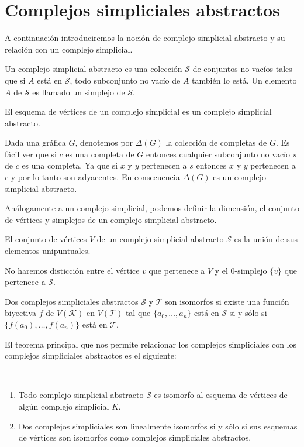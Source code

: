 \section{Complejos simpliciales abstractos}
A continuación introduciremos la noción de complejo simplicial abstracto y su relación con un complejo simplicial.
\begin{Defi}
Un complejo simplicial abstracto es una colección $\mathcal{S}$ de conjuntos no vacíos tales que si $A$ está en $\mathcal{S}$, todo subconjunto no vacío de $A$ también lo está. Un elemento $\textit{A}$ de $\mathcal{S}$ es llamado un simplejo de $\mathcal{S}$. 
\end{Defi}
\begin{Ejem}
El esquema de vértices de un complejo simplicial es un complejo simplicial abstracto.
\end{Ejem}
\begin{Ejem}
Dada una gráfica $G$, denotemos por $\Delta(G)$ la colección de completas de $G$. Es fácil ver que si $c$ es una completa de $G$ entonces cualquier subconjunto no vacío $s$ de $c$ es una completa. Ya que si $x$ y $y$ pertenecen a $s$ entonces $x$ y $y$ pertenecen a $c$ y por lo tanto son adyacentes. En consecuencia $\Delta(G)$ es un complejo simplicial abstracto.
\end{Ejem}
Análogamente a un complejo simplicial, podemos definir la dimensión, el conjunto de vértices y simplejos de un complejo simplicial abstracto.
\begin{Defi}
El conjunto de vértices $V$ de un complejo simplicial abstracto $\mathcal{S}$ es la unión de sus elementos unipuntuales.
\end{Defi}
No haremos disticción entre el vértice $v$ que pertenece a $V$ y el 0-simplejo $\{v\}$ que pertenece a $\mathcal{S}$.
\begin{Defi}
Dos complejos simpliciales abstractos $\mathcal{S}$ y $\mathcal{T}$ son isomorfos si existe una función biyectiva $f$ de $V(\mathcal{K})$ en $V(\mathcal{T})$ tal que $\{a_0,\ldots,a_n\}$ está en $\mathcal{S}$ si y sólo si $\{f(a_0),\ldots,f(a_n)\}$ está en $\mathcal{T}$.
\end{Defi}
El teorema principal que nos permite relacionar los complejos simpliciales con los complejos simpliciales abstractos es el siguiente:
\begin{Teo}\label{tpc} 
~\begin{enumerate}
\item Todo complejo simplicial abstracto $\mathcal{S}$ es isomorfo al esquema de vértices de algún complejo simplicial $K$.
\item Dos complejos simpliciales son linealmente isomorfos si y sólo si sus esquemas de vértices son isomorfos como complejos simpliciales abstractos.
\end{enumerate}
\end{Teo}

